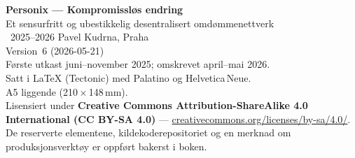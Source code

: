 \thispagestyle{empty}
\ifdefined\printmode\vspace*{\fill}\else{}\fi
\begin{flushleft}\small\sffamily
\textbf{Personix --- Kompromissløs endring}\\[0.3em]
Et sensurfritt og ubestikkelig desentralisert omdømmenettverk\\[1.4em]

\textcopyright\ 2025--2026 Pavel Kudrna, Praha\\[0.4em]

Version~6 (2026-05-21)\\
Første utkast juni--november 2025; omskrevet april--mai 2026.\\[1.4em]

Satt i \LaTeX{} (Tectonic) med Palatino og Helvetica\,Neue.\\
A5 liggende (210\,$\times$\,148\,mm).\\[1.4em]

Lisensiert under \textbf{Creative Commons Attribution-ShareAlike 4.0
International (CC BY-SA 4.0)} ---
\href{https://creativecommons.org/licenses/by-sa/4.0/}{creativecommons.org/licenses/by-sa/4.0/}.
De reserverte elementene, kildekoderepositoriet og en merknad om
produksjonsverktøy er oppført bakerst i boken.
\end{flushleft}
\ifdefined\printmode\else{}\fi
\clearpage
